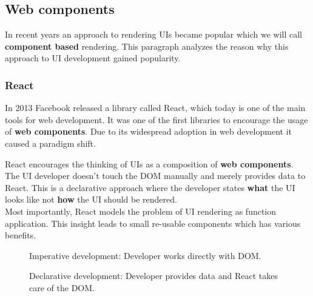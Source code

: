 \subsection{Web components}\label{webcomponents}

In recent years an approach to rendering UIs became popular which we will call \textbf{component based} rendering. This paragraph analyzes the reason why this approach to UI development gained popularity.

\subsubsection{React}\label{sec:react}

In 2013 Facebook released a library called React, which today is one of the main tools for web development. It was one of the first libraries to encourage the usage of \textbf{web components}. Due to its widespread adoption in web development it caused a paradigm shift.

React encourages the thinking of UIs as a composition of \textbf{web components}. The UI developer doesn't touch the DOM manually and merely provides data to React. This is a declarative approach where the developer states \textbf{what} the UI looks like not \textbf{how} the UI should be rendered. \\
Most importantly, React models the problem of UI rendering as function application. This insight leads to small re-usable components which has various benefits.

\begin{figure}[!htb]
  \caption{Imperative development: Developer works directly with DOM.}
\end{figure}

\begin{figure}[!htb]
  \caption{Declarative development: Developer provides data and React takes care of the DOM.}
\end{figure}

